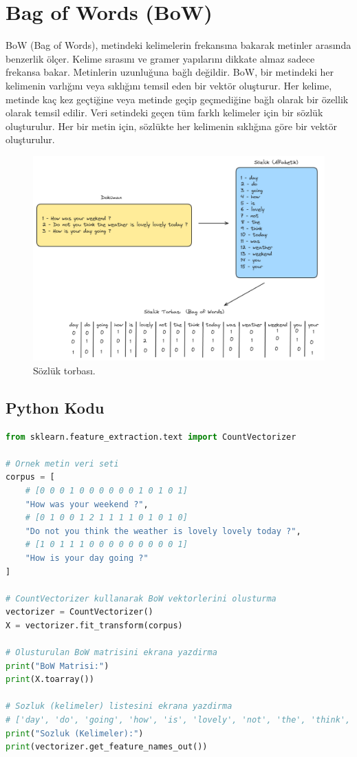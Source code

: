 \section{Bag of Words (BoW)}
BoW (Bag of Words), metindeki kelimelerin frekansına bakarak metinler arasında benzerlik ölçer. Kelime sırasını ve gramer yapılarını dikkate almaz sadece frekansa bakar. Metinlerin uzunluğuna bağlı değildir. BoW, bir metindeki her kelimenin varlığını veya sıklığını temsil eden bir vektör oluşturur. Her kelime, metinde kaç kez geçtiğine veya metinde geçip geçmediğine bağlı olarak bir özellik olarak temsil edilir. Veri setindeki geçen tüm farklı kelimeler için bir sözlük oluşturulur. Her bir metin için, sözlükte her kelimenin sıklığına göre bir vektör oluşturulur.  

\begin{figure}[h]
    \centering
    \includegraphics[width=1\textwidth]{images/bag_of_words.png}
    \caption{Sözlük torbası.}
    \label{fig:enter-label}
\end{figure}

\subsection{Python Kodu}

\begin{lstlisting}[language=Python]
from sklearn.feature_extraction.text import CountVectorizer

# Ornek metin veri seti
corpus = [
    # [0 0 0 1 0 0 0 0 0 0 1 0 1 0 1]
    "How was your weekend ?",
    # [0 1 0 0 1 2 1 1 1 1 0 1 0 1 0]
    "Do not you think the weather is lovely lovely today ?",
    # [1 0 1 1 1 0 0 0 0 0 0 0 0 0 1]
    "How is your day going ?"
]

# CountVectorizer kullanarak BoW vektorlerini olusturma
vectorizer = CountVectorizer()
X = vectorizer.fit_transform(corpus)

# Olusturulan BoW matrisini ekrana yazdirma
print("BoW Matrisi:")
print(X.toarray())

# Sozluk (kelimeler) listesini ekrana yazdirma
# ['day', 'do', 'going', 'how', 'is', 'lovely', 'not', 'the', 'think', 'today', 'was', 'weather', 'weekend', 'you', 'your']
print("Sozluk (Kelimeler):")
print(vectorizer.get_feature_names_out())
\end{lstlisting}

\newpage